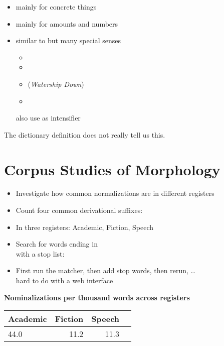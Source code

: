 \documentclass[a4paper,landscape,headrule,footrule,dvips]{foils}
\begin{document}
\begin{CJK}{UTF8}{min}

\begin{itemize}
\item {}  mainly for concrete things
\item {}  mainly for amounts and numbers
\item {} similar to  but many special senses
  \begin{itemize}
  \item {}  
  \item {}  
  \item {} (\textit{Watership Down})
  \item {} 
  \end{itemize}
also use as intensifier 
\end{itemize}

The dictionary definition does not really tell us this.

\section{Corpus Studies of Morphology}


\begin{itemize}
\item Investigate how common normalizations are in different registers
\item Count four common derivational suffixes:  
\item In three registers: Academic, Fiction, Speech
\item Search for words ending in 
\\ with a stop list: 
\item First run the matcher, then add stop words, then rerun, \ldots
\\ hard to do with a web interface
\end{itemize}

\noindent \textbf{Nominalizations per thousand words across registers}
\\ \begin{tabular}{lrrr}
 Academic & Fiction & Speech \\ \hline
 44.0   & 11.2    &  11.3   
\end{tabular}



\end{CJK}
\end{document}
